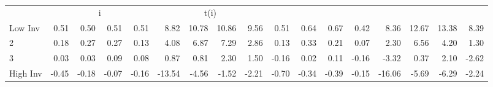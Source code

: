 \begin{table}[!ht]
\begin{tabular}{lrrrrrrrrrrrrrrrr}
      & \multicolumn{4}{c}{i} & \multicolumn{4}{c}{t(i)}
    
    \\
      \cmidrule(r){2-5} \cmidrule(r){6-9} \cmidrule(r){10-13} \cmidrule(r){14-17}

    Low Inv   & 0.51  & 0.50  & 0.51  & 0.51  & 8.82  & 10.78  & 10.86  & 9.56  & 0.51  & 0.64  & 0.67  & 0.42  & 8.36  & 12.67  & 13.38  & 8.39  \\
           2  & 0.18  & 0.27  & 0.27  & 0.13  & 4.08  & 6.87  & 7.29  & 2.86  & 0.13  & 0.33  & 0.21  & 0.07  & 2.30  & 6.56  & 4.20  & 1.30  \\
           3  & 0.03  & 0.03  & 0.09  & 0.08  & 0.87  & 0.81  & 2.30  & 1.50  & -0.16  & 0.02  & 0.11  & -0.16  & -3.32  & 0.37  & 2.10  & -2.62  \\
    High Inv  & -0.45  & -0.18  & -0.07  & -0.16  & -13.54  & -4.56  & -1.52  & -2.21  & -0.70  & -0.34  & -0.39  & -0.15  & -16.06  & -5.69  & -6.29  & -2.24  \\

  

  \bottomrule
\end{tabular}
\label{tbl:32_Size_BM_Inv_B16b}
\end{table}